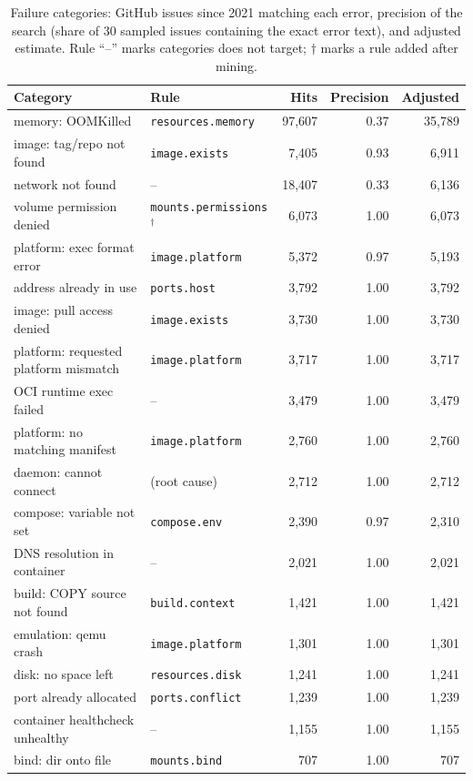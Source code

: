\begin{table}[t]
\centering\scriptsize
\caption{Failure categories: GitHub issues since 2021 matching each error, precision of the search (share of 30 sampled issues containing the exact error text), and adjusted estimate. Rule ``--'' marks categories \tool{} does not target; $\dagger$ marks a rule added after mining.}
\label{tab:categories}
\begin{tabular}{@{}llrrr@{}}
\toprule
Category & Rule & Hits & Precision & Adjusted \\
\midrule
memory: OOMKilled & \texttt{resources.memory} & 97,607 & 0.37 & 35,789 \\
image: tag/repo not found & \texttt{image.exists} & 7,405 & 0.93 & 6,911 \\
network not found & -- & 18,407 & 0.33 & 6,136 \\
volume permission denied & \texttt{mounts.permissions}$^\dagger$ & 6,073 & 1.00 & 6,073 \\
platform: exec format error & \texttt{image.platform} & 5,372 & 0.97 & 5,193 \\
address already in use & \texttt{ports.host} & 3,792 & 1.00 & 3,792 \\
image: pull access denied & \texttt{image.exists} & 3,730 & 1.00 & 3,730 \\
platform: requested platform mismatch & \texttt{image.platform} & 3,717 & 1.00 & 3,717 \\
OCI runtime exec failed & -- & 3,479 & 1.00 & 3,479 \\
platform: no matching manifest & \texttt{image.platform} & 2,760 & 1.00 & 2,760 \\
daemon: cannot connect & (root cause) & 2,712 & 1.00 & 2,712 \\
compose: variable not set & \texttt{compose.env} & 2,390 & 0.97 & 2,310 \\
DNS resolution in container & -- & 2,021 & 1.00 & 2,021 \\
build: COPY source not found & \texttt{build.context} & 1,421 & 1.00 & 1,421 \\
emulation: qemu crash & \texttt{image.platform} & 1,301 & 1.00 & 1,301 \\
disk: no space left & \texttt{resources.disk} & 1,241 & 1.00 & 1,241 \\
port already allocated & \texttt{ports.conflict} & 1,239 & 1.00 & 1,239 \\
container healthcheck unhealthy & -- & 1,155 & 1.00 & 1,155 \\
bind: dir onto file & \texttt{mounts.bind} & 707 & 1.00 & 707 \\

\end{tabular}
\end{table}

